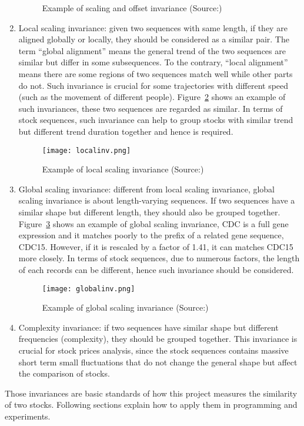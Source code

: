 \begin{enumerate}
\begin{figure}[!htbp]
        \caption{Example of scaling and offset invariance (Source:\cite{batista2014cid})} 
        \label{fig:scalinv} 
    \end{figure} 
    \item Local scaling invariance: given two sequences with same length, if they are aligned globally or locally, they should be considered as a similar pair. The term ``global alignment'' means the general trend of the two sequences are similar but differ in some subsequences. To the contrary, ``local alignment'' means there are some regions of two sequences match well while other parts do not. Such invariance is crucial for some trajectories with different speed (such as the movement of different people). Figure~\ref{fig:localinv} shows an example of such invariances, these two sequences are regarded as similar. In terms of stock sequences, such invariance can help to group stocks with similar trend but different trend duration together and hence is required.
    \begin{figure}[!htbp]
        \centering
        \texttt{[image: localinv.png]}
        \caption{Example of local scaling invariance (Source:\cite{batista2014cid})}
        \label{fig:localinv}
    \end{figure} 
    \item Global scaling invariance: different from local scaling invariance, global scaling invariance is about length-varying sequences. If two sequences have a similar shape but different length, they should also be grouped together. Figure~\ref{fig:globalinv} shows an example of global scaling invariance, CDC is a full gene expression and it matches poorly to the prefix of a related gene sequence, CDC15. However, if it is rescaled by a factor of 1.41, it can matches CDC15 more closely. In terms of stock sequences, due to numerous factors, the length of each records can be different, hence such invariance should be considered.
    \begin{figure}[!htbp]
        \centering
        \texttt{[image: globalinv.png]}
        \caption{Example of global scaling invariance (Source:\cite{batista2014cid})}
        \label{fig:globalinv}
    \end{figure} 
    \item Complexity invariance: if two sequences have similar shape but different frequencies (complexity), they should be grouped together. This invariance is crucial for stock prices analysis, since the stock sequences contains massive short term small fluctuations that do not change the general shape but affect the comparison of stocks.
\end{enumerate}
Those invariances are basic standards of how this project measures the similarity of two stocks. Following sections explain how to apply them in programming and experiments.

